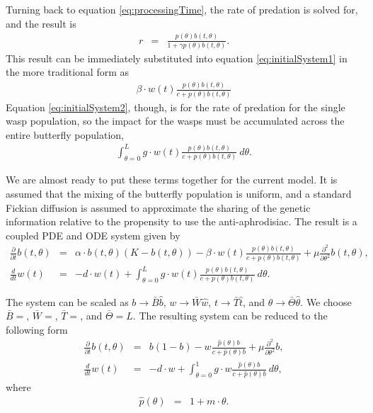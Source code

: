 \documentclass[12pt]{article}
\begin{document}
Turning back to equation \ref{eq:processingTime}, the rate of
predation is solved for, and the result is
\begin{eqnarray}
  \label{eq:rateOfPredation}
  r & = &  \frac{p(\theta) b(t,\theta) }{1 + \gamma p(\theta) b(t,\theta)}.
\end{eqnarray}
This result can be immediately substituted into equation
\ref{eq:initialSystem1} in the more traditional form as
\begin{eqnarray}
  \label{eq:butterflyPredationRate}
  \beta \cdot w(t) \frac{p(\theta) b(t,\theta) }{c +  p(\theta) b(t,\theta)}
\end{eqnarray}
Equation \ref{eq:initialSystem2}, though, is for the rate of predation
for the single wasp population, so the impact for the wasps must be
accumulated across the entire butterfly population,
\begin{eqnarray}
  \label{eq:waspPredationRate}
  \int^L_{\theta=0} g \cdot w(t) \frac{p(\theta) b(t,\theta) }{c + p(\theta) b(t,\theta)} ~ d\theta.
\end{eqnarray}

We are almost ready to put these terms together for the current
model. It is assumed that the mixing of the butterfly population is
uniform, and a standard Fickian diffusion is assumed to approximate
the sharing of the genetic information relative to the propensity to
use the anti-aphrodisiac. The result is a coupled PDE and ODE system
given by 
\begin{eqnarray}
  \label{eq:odePDE1}
  \frac{\partial}{\partial t} b(t,\theta) & = &
      \alpha \cdot b(t,\theta) (K - b(t,\theta))
      - \beta \cdot w(t) \frac{p(\theta) b(t,\theta)}{c+p(\theta)b(t,\theta)}
      + \mu \frac{\partial^2}{\partial \theta^2} b(t,\theta) , \\
  \label{eq:odePDE2}
  \frac{d}{dt} w(t) & = & -d \cdot w(t) +
      \int^L_{\theta=0} g \cdot w(t) \frac{p(\theta) b(t,\theta) }{c + p(\theta) b(t,\theta)} ~ d\theta.
\end{eqnarray}

The system can be scaled as $b\rightarrow \bar{B}\hat{b}$,
$w\rightarrow \bar{W}\hat{w}$, $t\rightarrow \bar{T}\hat{t}$, and
$\theta\rightarrow \bar{\Theta}\hat{\theta}$. We choose $\bar{B}=$,
$\bar{W}=$, $\bar{T}=$, and $\bar{\Theta}=L$. The resulting system
can be reduced to the following form
\begin{eqnarray}
  \label{eq:scaledodePDE1}
  \frac{\partial}{\partial t} b(t,\theta) & = &
      b (1 - b)
      -  w \frac{\hat{p}(\theta) b}{c+\hat{p}(\theta)b}
      + \mu \frac{\partial^2}{\partial \theta^2} b , \\
  \label{eq:scaledodePDE2}
  \frac{d}{dt} w(t) & = & -d \cdot w +
      \int^1_{\theta=0} g \cdot w \frac{\hat{p}(\theta) b }{c + \hat{p}(\theta) b} ~ d\theta,
\end{eqnarray}
where
\begin{eqnarray}
  \hat{p}(\theta) & = & 1 + m \cdot \theta.
\end{eqnarray}
\end{document}
